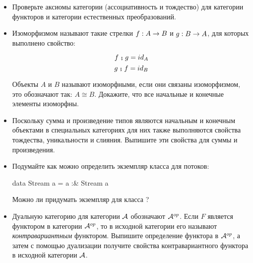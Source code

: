 \begin{itemize}
\item
  Проверьте аксиомы категории (ассоциативность и тождество) для
  категории функторов и категории естественных преобразований.
\item
  Изоморфизмом называют такие стрелки $f:A \rightarrow B$ и $g : B \rightarrow A$, для
  которых выполнено свойство:

  \[f \footnotesize\textbf{~;~}\normalsize g = id_A\] \[g \footnotesize\textbf{~;~}\normalsize f = id_B\]

  Объекты $A$ и $B$ называют изоморфными, если они связаны изоморфизмом,
  это обозначают так: $A \cong B$. Докажите, что все начальные и
  конечные элементы изоморфны.
\item
  Поскольку сумма и произведение типов являются начальным и конечным
  объектами в специальных категориях для них также выполняются свойства
  тождества, уникальности и слияния. Выпишите эти свойства для суммы и
  произведения.
\item
  Подумайте как можно определить экземпляр класса  для
  потоков:


  \begin{code}
  data Stream a = a :& Stream a
  \end{code}

  Можно ли придумать экземпляр для класса ?
\item
  Дуальную категорию для категории $\mathcal{A}$ обозначают $\mathcal{A}^{op}$. Если
  $F$ является функтором в категории $\mathcal{A}^{op}$, то в исходной
  категории его называют \emph{контравариантным} функтором. Выпишите
  определение функтора в $\mathcal{A}^{op}$, а затем с помощью дуализации
  получите свойства контравариантного функтора в исходной категории
  $\mathcal{A}$.
\end{itemize}

